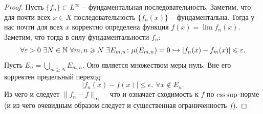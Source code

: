 \begin{proof}
    Пусть $\{f_n\} \subset L^{\infty}$ -- фундаментальная последовательность.
    Заметим, что для почти всех $x \in X$ последовательность $\{f_n(x)\}$ -- фундаментальна.
    Тогда у нас почти для всех $x$ корректно определена функция $f(x) = \lim f_n(x)$.
    Заметим, что тогда в силу фундаментальности $f_n\colon$
    \[
        \forall \varepsilon > 0 \ \exists N \in \mathbb{N} \ \forall m, n \geqslant N \ \exists E_{m, n}\colon \mu(E_{m, n}) = 0 \hookrightarrow |f_n(x) - f_m(x)| \leqslant \varepsilon.
    \]
    Пусть $E_n = \bigcup_{m \geq N} E_{m, n}$.
    Оно является множеством меры нуль.
    Вне его корректен предельный переход:
    \[
        |f_n(x) - f(x)| \leq \epsilon, \ \forall x \notin E_n.
    \]
    Из чего и следует $\|f_n - f\|_\infty$ -- что и означает сходимость к $f$ по $\operatorname*{ess\,sup}$-норме (и из чего очевидным образом следует и существенная ограниченность $f$).
\end{proof}
